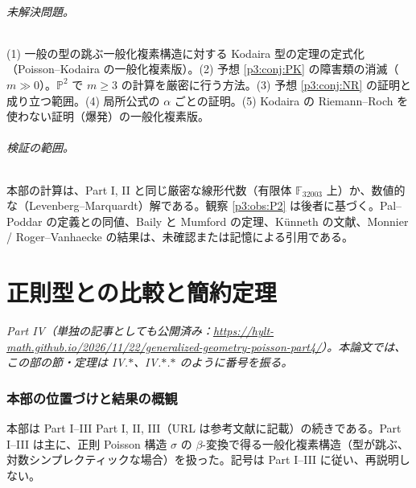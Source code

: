 \paragraph{未解決問題。}(1) 一般の型の跳ぶ一般化複素構造に対する Kodaira 型の定理の定式化（Poisson--Kodaira の一般化複素版）。(2) 予想 \ref{p3:conj:PK} の障害類の消滅（$m\gg0$）。$\mathbb P^2$ で $m\ge3$ の計算を厳密に行う方法。(3) 予想 \ref{p3:conj:NR} の証明と成り立つ範囲。(4) 局所公式の $\alpha$ ごとの証明。(5) Kodaira の Riemann--Roch を使わない証明（爆発）の一般化複素版。\par
\paragraph{検証の範囲。}本部の計算は、Part I, II と同じ厳密な線形代数（有限体 $\mathbb F_{32003}$ 上）か、数値的な（Levenberg--Marquardt）解である。観察 \ref{p3:obs:P2} は後者に基づく。Pal--Poddar の定義との同値、Baily と Mumford の定理、Künneth の文献、Monnier / Roger--Vanhaecke の結果は、未確認または記憶による引用である。



\clearpage
\part{正則型との比較と簡約定理}
\setcounter{section}{0}
\noindent\textit{Part IV（単独の記事としても公開済み：\url{https://hylt-math.github.io/2026/11/22/generalized-geometry-poisson-part4/}）。本論文では、この部の節・定理は IV.$\ast$、IV.$\ast$.$\ast$ のように番号を振る。}\par
\section{本部の位置づけと結果の概観}\label{p4:sec:intro}
本部は Part I--III Part I, II, III（URL は参考文献に記載）の続きである。Part I--III は主に、正則 Poisson 構造 $\sigma$ の $\beta$-変換で得る一般化複素構造（型が跳ぶ、対数シンプレクティックな場合）を扱った。記号は Part I--III に従い、再説明しない。


